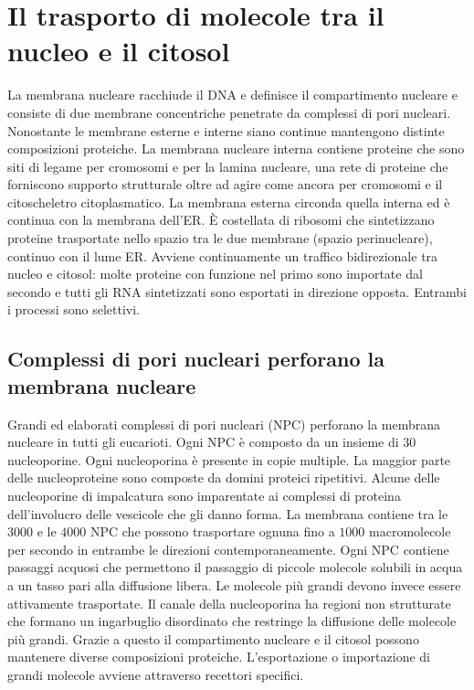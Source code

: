 \section{Il trasporto di molecole tra il nucleo e il citosol}
La membrana nucleare racchiude il DNA e definisce il compartimento nucleare e consiste di due membrane concentriche penetrate da complessi di pori nucleari. Nonostante le membrane
esterne e interne siano continue mantengono distinte composizioni proteiche. La membrana nucleare interna contiene proteine che sono siti di legame per cromosomi e per la lamina
nucleare, una rete di proteine che forniscono supporto strutturale oltre ad agire come ancora per cromosomi e il citoscheletro citoplasmatico. La membrana esterna circonda quella interna
ed \`e continua con la membrana dell'ER. \`E costellata di ribosomi che sintetizzano proteine trasportate nello spazio tra le due membrane (spazio perinucleare), continuo con il lume ER.
Avviene continuamente un traffico bidirezionale tra nucleo e citosol: molte proteine con funzione nel primo sono importate dal secondo e tutti gli RNA sintetizzati sono esportati in
direzione opposta. Entrambi i processi sono selettivi. 
\subsection{Complessi di pori nucleari perforano la membrana nucleare}
Grandi ed elaborati complessi di pori nucleari (NPC) perforano la membrana nucleare in tutti gli eucarioti. Ogni NPC \`e composto da un insieme di $30$ nucleoporine. Ogni nucleoporina
\`e presente in copie multiple. La maggior parte delle nucleoproteine sono composte da domini proteici ripetitivi. Alcune delle nucleoporine di impalcatura sono imparentate ai complessi
di proteina dell'involucro delle vescicole che gli danno forma. La membrana contiene tra le $3000$ e le $4000$ NPC che possono trasportare ognuna fino a $1000$ macromolecole per secondo
in entrambe le direzioni contemporaneamente. Ogni NPC contiene passaggi acquosi che permettono il passaggio di piccole molecole solubili in acqua a un tasso pari alla diffusione libera.
Le molecole pi\`u grandi devono invece essere attivamente trasportate. Il canale della nucleoporina ha regioni non strutturate che formano un ingarbuglio disordinato che restringe la
diffusione delle molecole pi\`u grandi. Grazie a questo il compartimento nucleare e il citosol possono mantenere diverse composizioni proteiche. L'esportazione o importazione di 
grandi molecole avviene attraverso recettori specifici. 
